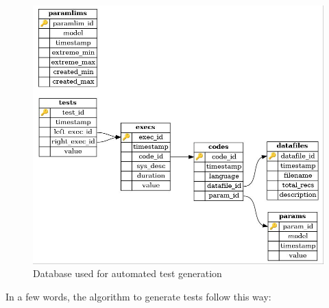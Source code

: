 \documentclass[a4paper,10pt]{article}
\begin{document}
\begin{figure}[h]
    \centering
    \includegraphics[scale=0.35]
        {../img/schema.jpg}
    \caption{Database used for automated test generation}
    \label{fig:schema}
\end{figure}

In a few words, the algorithm to generate tests follow this way:
\end{document}
